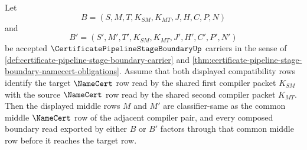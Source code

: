 \begin{theorem}
\label{thm:certificate-pipeline-stage-boundary-middle-row-determinacy}
Let
$$
B=(S,M,T,K_{SM},K_{MT},J,H,C,P,N)
$$
and
$$
B'=(S',M',T',K_{SM},K_{MT},J',H',C',P',N')
$$
be accepted $\CertificatePipelineStageBoundaryUp$ carriers in the sense of \autoref{def:certificate-pipeline-stage-boundary-carrier} and \autoref{thm:certificate-pipeline-stage-boundary-namecert-obligations}. Assume that both displayed compatibility rows identify the target $\NameCert$ row read by the shared first compiler packet $K_{SM}$ with the source $\NameCert$ row read by the shared second compiler packet $K_{MT}$. Then the displayed middle rows $M$ and $M'$ are classifier-same as the common middle $\NameCert$ row of the adjacent compiler pair, and every composed boundary read exported by either $B$ or $B'$ factors through that common middle row before it reaches the target row.
\end{theorem}
